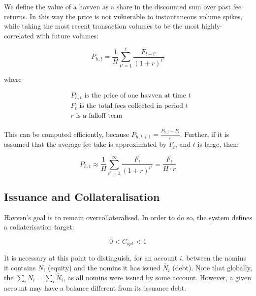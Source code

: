 \noindent We define the value of a havven as a share in the discounted sum over past fee returns.
In this way the price is not vulnerable to instantaneous volume spikes, while
taking the most recent transaction volumes to be the most highly-correlated with future volumes:

\begin{equation}
    P_{h,t} = \frac{1}{H} \sum_{t'=1}^{t} \frac{F_{t - t'}}{(1 + r)^{t'}} \label{eq:price}
\end{equation}

where

\begin{align*} 
& P_{h,t} \text{ is the price of one havven at time } t  \\
& F_t \text{ is the total fees collected in period } t\\
& r \text{ is a falloff term}  \\
\end{align*}

\newpage

\noindent This can be computed efficiently, because $P_{h,t+1} = \frac{P_{h,t} + F_t}{r}$. 
Further, if it is assumed that the average fee take is approximated by $F_t$, and $t$ is large, then:

\begin{equation}
    P_{h,t} \approx \frac{1}{H} \sum_{t'=1}^{\infty} \frac{F_t}{(1 + r)^{t'}} = \frac{F_t}{H \cdot r}
\end{equation}

\subsection{Issuance and Collateralisation} 


\noindent Havven's goal is to remain overcollateralised. In order to do so, the system defines a collaterisation target:

\begin{equation}
0 < C_{opt} < 1  \label{eq:target}
\end{equation}

\vspace{3 mm}

\noindent It is necessary at this point to distinguish, for an account $i$, between the nomins it contains $N_i$ (equity) and the nomins it has issued $\check{N_i}$ (debt). Note that globally, the $\sum_{i}N_i = \sum_{i}\check{N_i}$, as all nomins were issued by some account. However, a given account may have a balance different from its issuance debt.\\

